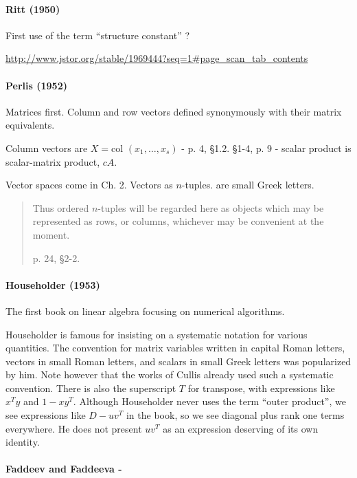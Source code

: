 \paragraph{Ritt (1950)~\cite{Ritt1950}}

First use of the term ``structure constant'' ?

\url{http://www.jstor.org/stable/1969444?seq=1#page_scan_tab_contents}


\paragraph{Perlis (1952)~\cite{Perlis1952}}

Matrices first. Column and row vectors defined synonymously with their matrix equivalents.

Column vectors are $X = \textrm{col }(x_1, \dots, x_s)$ - p. 4, \S 1.2.
\S 1-4, p. 9 - scalar product is scalar-matrix product, $c A$.

Vector spaces come in Ch. 2. Vectors as $n$-tuples. are small Greek letters.

\begin{quote}
Thus ordered $n$-tuples will be regarded here as objects which may be represented as rows, or columns, whichever may be convenient at the moment.

p. 24, \S2-2.
\end{quote}


\paragraph{Householder (1953)~\cite{Householder1953}}

The first book on linear algebra focusing on numerical algorithms.

Householder is famous for insisting on a systematic notation for various quantities.
The convention for matrix variables written in capital Roman letters, vectors in small Roman letters, and scalars in small Greek letters was popularized by him. Note however that the works of Cullis already used such a systematic convention.
There is also the superscript $T$ for transpose, with expressions like $x^T y$ and $1 - x y^T$.
Although Householder never uses the term ``outer product'', we see expressions like $D - u v^T$ in the book, so we see diagonal plus rank one terms everywhere. He does not present $u v^T$ as an expression deserving of its own identity.


\paragraph{Faddeev and Faddeeva - \cite{Faddeev1959}}

